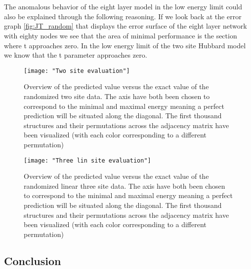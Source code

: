 \documentclass[12pt]{article}
\begin{document}
\\
\\
The anomalous behavior of the eight layer model in the low energy limit could also be explained through the following reasoning. If we look back at the error graph \ref{fig:JT_random} that displays the error surface of the eight layer network with eighty nodes we see that the area of minimal performance is the section where t approaches zero. In the low energy limit of the two site Hubbard model we know that the t parameter approaches zero. 

\begin{figure}[H]
	\centering
	\texttt{[image: "Two site evaluation"]}
	\caption{Overview of the predicted value versus the exact value of the randomized  two site data. The axis have both been chosen to correspond to the minimal and maximal energy meaning a perfect prediction will be situated along the diagonal. The first thousand structures and their permutations across the adjacency matrix have been visualized (with each color corresponding to a different permutation)}
	\label{fig:OStwo}
\end{figure}
\begin{figure}[H]
	\centering
	\texttt{[image: "Three lin site evaluation"]}
	\caption{Overview of the predicted value versus the exact value of the randomized  linear three site data. The axis have both been chosen to correspond to the minimal and maximal energy meaning a perfect prediction will be situated along the diagonal. The first thousand structures and their permutations across the adjacency matrix have been visualized (with each color corresponding to a different permutation)}
	\label{fig:OSthree}
\end{figure}
\newpage
\subsection{Conclusion}
\end{document}
